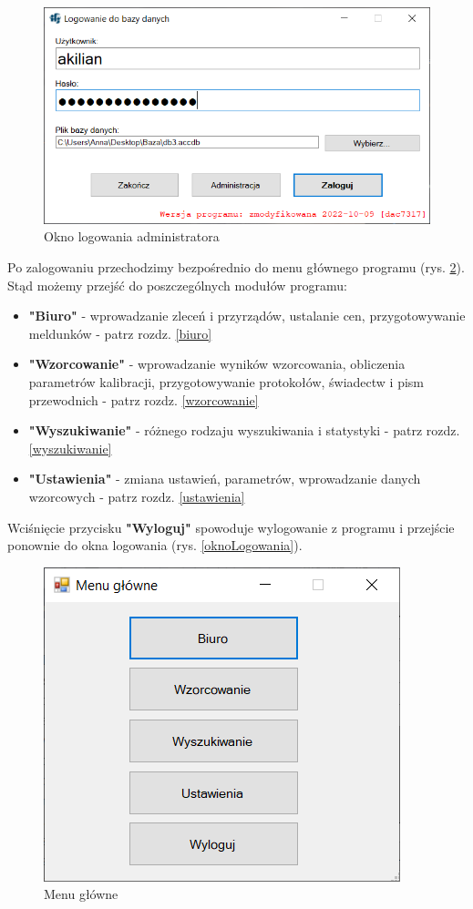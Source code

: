\begin{figure}[htb]
	\centering
	\includegraphics{obrazki/Logowanie/logowanie_administracja.png}
	\caption{Okno logowania administratora}
	\label{oknoLogowaniaAdmina}
\end{figure}

Po zalogowaniu przechodzimy bezpośrednio do menu głównego programu (rys. \ref{menuGlowne}). Stąd możemy przejść do poszczególnych modułów programu:
\begin{itemize}
	\item \textbf{"Biuro"} - wprowadzanie zleceń i przyrządów, ustalanie cen, przygotowywanie meldunków - patrz rozdz. \ref{biuro}
	\item \textbf{"Wzorcowanie"} - wprowadzanie wyników wzorcowania, obliczenia parametrów kalibracji, przygotowywanie protokołów, świadectw i pism przewodnich - patrz rozdz. \ref{wzorcowanie}
	\item \textbf{"Wyszukiwanie"} - różnego rodzaju wyszukiwania i statystyki - patrz rozdz. \ref{wyszukiwanie}
	\item \textbf{"Ustawienia"} - zmiana ustawień, parametrów, wprowadzanie danych wzorcowych - patrz rozdz. \ref{ustawienia}
\end{itemize}

Wciśnięcie przycisku \textbf{"Wyloguj"} spowoduje wylogowanie z programu i przejście ponownie do okna logowania (rys. \ref{oknoLogowania}).

\begin{figure}[htb]
	\centering
	\includegraphics{obrazki/Logowanie/menu_glowne.png}
	\caption{Menu główne}
	\label{menuGlowne}
\end{figure}

